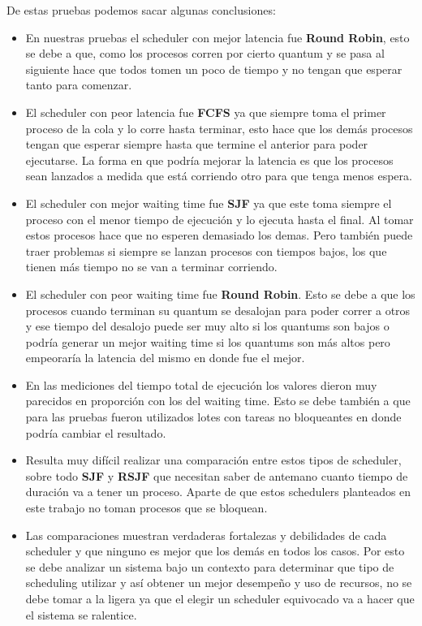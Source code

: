 De estas pruebas podemos sacar algunas conclusiones:

\begin{itemize}

\item En nuestras pruebas el scheduler con mejor latencia fue \textbf{Round Robin}, esto se debe a que, como los procesos corren por cierto quantum y se pasa al siguiente hace que todos tomen un poco de tiempo y no tengan que esperar tanto para comenzar.

\item El scheduler con peor latencia fue \textbf{FCFS} ya que siempre toma el primer proceso de la cola y lo corre hasta terminar, esto hace que los demás procesos tengan que esperar siempre hasta que termine el anterior para poder ejecutarse. La forma en que podría mejorar la latencia es que los procesos sean lanzados a medida que está corriendo otro para que tenga menos espera.

\item El scheduler con mejor waiting time fue \textbf{SJF} ya que este toma siempre el proceso con el menor tiempo de ejecución y lo ejecuta hasta el final. Al tomar estos procesos hace que no esperen demasiado los demas. Pero también puede traer problemas si siempre se lanzan procesos con tiempos bajos, los que tienen más tiempo no se van a terminar corriendo.

\item El scheduler con peor waiting time fue \textbf{Round Robin}. Esto se debe a que los procesos cuando terminan su quantum se desalojan para poder correr a otros y ese tiempo del desalojo puede ser muy alto si los quantums son bajos o podría generar un mejor waiting time si los quantums son más altos pero empeoraría la latencia del mismo en donde fue el mejor.

\item En las mediciones del tiempo total de ejecución los valores dieron muy parecidos en proporción con los del waiting time. Esto se debe también a que para las pruebas fueron utilizados lotes con tareas no bloqueantes en donde podría cambiar el resultado.

\item Resulta muy difícil realizar una comparación entre estos tipos de scheduler, sobre todo \textbf{SJF} y \textbf{RSJF} que necesitan saber de antemano cuanto tiempo de duración va a tener un proceso. Aparte de que estos schedulers planteados en este trabajo no toman procesos que se bloquean.

\item Las comparaciones muestran verdaderas fortalezas y debilidades de cada scheduler y que ninguno es mejor que los demás en todos los casos. Por esto se debe analizar un sistema bajo un contexto para determinar que tipo de scheduling utilizar y así obtener un mejor desempeño y uso de recursos, no se debe tomar a la ligera ya que el elegir un scheduler equivocado va a hacer que el sistema se ralentice.

\end{itemize}
